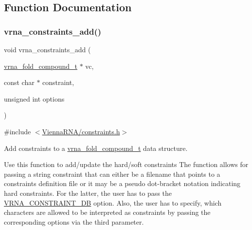 \subsection{Function Documentation}
\mbox{\label{group__constraints_ga35a401f680969a556858a8dd5f1d07cc}} 
\subsubsection{\texorpdfstring{vrna\+\_\+constraints\+\_\+add()}{vrna\_constraints\_add()}}
{\footnotesize\ttfamily void vrna\+\_\+constraints\+\_\+add (\begin{DoxyParamCaption}\item[{\hyperlink{group__fold__compound_ga1b0cef17fd40466cef5968eaeeff6166}{vrna\+\_\+fold\+\_\+compound\+\_\+t} $\ast$}]{vc,  }\item[{const char $\ast$}]{constraint,  }\item[{unsigned int}]{options }\end{DoxyParamCaption})}



{\ttfamily \#include $<$\hyperlink{constraints_8h}{Vienna\+R\+N\+A/constraints.\+h}$>$}



Add constraints to a \hyperlink{group__fold__compound_ga1b0cef17fd40466cef5968eaeeff6166}{vrna\+\_\+fold\+\_\+compound\+\_\+t} data structure. 

Use this function to add/update the hard/soft constraints The function allows for passing a string \textquotesingle{}constraint\textquotesingle{} that can either be a filename that points to a constraints definition file or it may be a pseudo dot-\/bracket notation indicating hard constraints. For the latter, the user has to pass the \hyperlink{group__hard__constraints_ga4bfc2f15c4f261c62a11af9d2aa80c90}{V\+R\+N\+A\+\_\+\+C\+O\+N\+S\+T\+R\+A\+I\+N\+T\+\_\+\+DB} option. Also, the user has to specify, which characters are allowed to be interpreted as constraints by passing the corresponding options via the third parameter.

